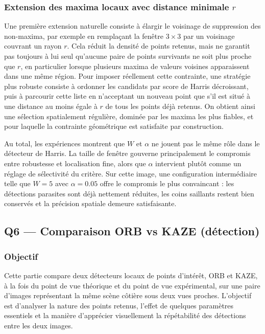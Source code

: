 \documentclass[11pt,a4paper]{article}
\begin{document}
\subsubsection{Extension des maxima locaux avec distance minimale \texorpdfstring{$r$}{r}}
Une première extension naturelle consiste à élargir le voisinage de suppression des non-maxima, par exemple en remplaçant la fenêtre \(3 \times 3\) par un voisinage couvrant un rayon \(r\). Cela réduit la densité de points retenus, mais ne garantit pas toujours à lui seul qu'aucune paire de points survivants ne soit plus proche que \(r\), en particulier lorsque plusieurs maxima de valeurs voisines apparaissent dans une même région. Pour imposer réellement cette contrainte, une stratégie plus robuste consiste à ordonner les candidats par score de Harris décroissant, puis à parcourir cette liste en n'acceptant un nouveau point que s'il est situé à une distance au moins égale à \(r\) de tous les points déjà retenus. On obtient ainsi une sélection spatialement régulière, dominée par les maxima les plus fiables, et pour laquelle la contrainte géométrique est satisfaite par construction.

Au total, les expériences montrent que \(W\) et \(\alpha\) ne jouent pas le même rôle dans le détecteur de Harris. La taille de fenêtre gouverne principalement le compromis entre robustesse et localisation fine, alors que \(\alpha\) intervient plutôt comme un réglage de sélectivité du critère. Sur cette image, une configuration intermédiaire telle que \(W=5\) avec \(\alpha=0.05\) offre le compromis le plus convaincant : les détections parasites sont déjà nettement réduites, les coins saillants restent bien conservés et la précision spatiale demeure satisfaisante.

\subsection{Q6 --- Comparaison ORB vs KAZE (détection)}

\subsubsection{Objectif}
Cette partie compare deux détecteurs locaux de points d'intérêt, ORB et KAZE, à la fois du point de vue théorique et du point de vue expérimental, sur une paire d'images représentant la même scène côtière sous deux vues proches. L'objectif est d'analyser la nature des points retenus, l'effet de quelques paramètres essentiels et la manière d'apprécier visuellement la répétabilité des détections entre les deux images.
\end{document}
